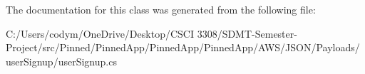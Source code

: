 The documentation for this class was generated from the following file\+:\begin{DoxyCompactItemize}
\item 
C\+:/\+Users/codym/\+One\+Drive/\+Desktop/\+C\+S\+C\+I 3308/\+S\+D\+M\+T-\/\+Semester-\/\+Project/src/\+Pinned/\+Pinned\+App/\+Pinned\+App/\+Pinned\+App/\+A\+W\+S/\+J\+S\+O\+N/\+Payloads/user\+Signup/user\+Signup.\+cs\end{DoxyCompactItemize}
